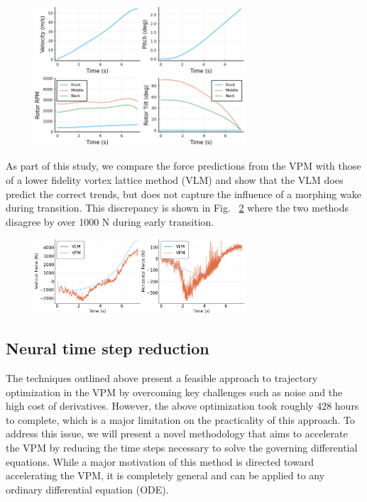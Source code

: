 \documentclass[12pt, letterpaper]{article}
\begin{document}
\begin{figure}[hbt!]
\centering
\includegraphics[width=0.7\textwidth]{figures/trajectory.png}
\caption{}
\label{fig:trajectory}
\end{figure}

As part of this study, we compare the force predictions from the VPM with those of a lower fidelity vortex lattice method (VLM) and show that the VLM does predict the correct trends, but does not capture the influence of a morphing wake during transition.  This discrepancy is shown in Fig. ~\ref{fig:comparison} where the two methods disagree by over 1000 N during early transition.

\begin{figure}[hbt!]
\centering
\includegraphics[width=0.7\textwidth]{figures/comparison.png}
\caption{}
\label{fig:comparison}
\end{figure}


\subsection{Neural time step reduction}

The techniques outlined above present a feasible approach to trajectory optimization in the VPM by overcoming key challenges such as noise and the high cost of derivatives.  However, the above optimization took roughly 428 hours to complete, which is a major limitation on the practicality of this approach. To address this issue, we will present a novel methodology that aims to accelerate the VPM by reducing the time steps necessary to solve the governing differential equations.  While a major motivation of this method is directed toward accelerating the VPM, it is completely general and can be applied to any ordinary differential equation (ODE).
\end{document}
